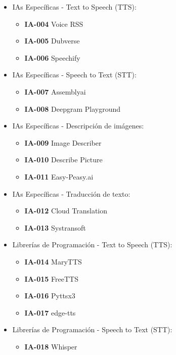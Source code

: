 \documentclass[lettersize,journal]{IEEEtran}
\begin{document}
\begin{itemize}
\begin{itemize}
		\item IAs Específicas - Text to Speech (TTS):
		\begin{itemize}
			\item \textbf{IA-004} Voice RSS
			\item \textbf{IA-005} Dubverse
			\item \textbf{IA-006} Speechify
		\end{itemize}
		
		\item IAs Específicas - Speech to Text (STT):
		\begin{itemize}
			\item \textbf{IA-007} Assemblyai
			\item \textbf{IA-008} Deepgram Playground
		\end{itemize}
		
		\item IAs Específicas - Descripción de imágenes:
		\begin{itemize}
			\item \textbf{IA-009} Image Describer
			\item \textbf{IA-010} Describe Picture
			\item \textbf{IA-011} Easy-Peasy.ai
		\end{itemize}
		
		\item IAs Específicas - Traducción de texto:
		\begin{itemize}
			\item \textbf{IA-012} Cloud Translation
			\item \textbf{IA-013} Systransoft
		\end{itemize}
		
		\item Librerías de Programación - Text to Speech (TTS):
		\begin{itemize}
			\item \textbf{IA-014} MaryTTS
			\item \textbf{IA-015} FreeTTS
			\item \textbf{IA-016} Pyttsx3
			\item \textbf{IA-017} edge-tts
		\end{itemize}
		
		\item Librerías de Programación - Speech to Text (STT):
		\begin{itemize}
			\item \textbf{IA-018} Whisper
		\end{itemize}
		

\end{itemize}
\end{itemize}
\end{document}
